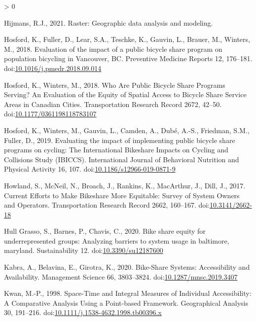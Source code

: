\documentclass[]{elsarticle} %
\newlength{\cslhangindent}
\newenvironment{CSLReferences}[2] %
 {%
  \setlength{\parindent}{0pt}
  \ifodd #1 \everypar{\setlength{\hangindent}{\cslhangindent}}\ignorespaces\fi
  \ifnum #2 > 0
  \setlength{\parskip}{#2\baselineskip}
  \fi
 }%
 {}
\begin{document}
\begin{CSLReferences}{1}{0}
\leavevmode\hypertarget{ref-R-raster}{}%
Hijmans, R.J., 2021. Raster: Geographic data analysis and modeling.

\leavevmode\hypertarget{ref-hosfordEvaluationImpactPublic2018}{}%
Hosford, K., Fuller, D., Lear, S.A., Teschke, K., Gauvin, L., Brauer,
M., Winters, M., 2018. Evaluation of the impact of a public bicycle
share program on population bicycling in {Vancouver}, {BC}. Preventive
Medicine Reports 12, 176--181.
doi:\href{https://doi.org/10.1016/j.pmedr.2018.09.014}{10.1016/j.pmedr.2018.09.014}

\leavevmode\hypertarget{ref-hosfordWhoArePublic2018}{}%
Hosford, K., Winters, M., 2018. Who {Are Public Bicycle Share Programs
Serving}? {An Evaluation} of the {Equity} of {Spatial Access} to
{Bicycle Share Service Areas} in {Canadian Cities}. Transportation
Research Record 2672, 42--50.
doi:\href{https://doi.org/10.1177/0361198118783107}{10.1177/0361198118783107}

\leavevmode\hypertarget{ref-hosfordEvaluatingImpactImplementing2019}{}%
Hosford, K., Winters, M., Gauvin, L., Camden, A., Dubé, A.-S., Friedman,
S.M., Fuller, D., 2019. Evaluating the impact of implementing public
bicycle share programs on cycling: The {International Bikeshare Impacts}
on {Cycling} and {Collisions Study} ({IBICCS}). International Journal of
Behavioral Nutrition and Physical Activity 16, 107.
doi:\href{https://doi.org/10.1186/s12966-019-0871-9}{10.1186/s12966-019-0871-9}

\leavevmode\hypertarget{ref-howlandCurrentEffortsMake2017}{}%
Howland, S., McNeil, N., Broach, J., Rankins, K., MacArthur, J., Dill,
J., 2017. Current {Efforts} to {Make Bikeshare More Equitable}: {Survey}
of {System Owners} and {Operators}. Transportation Research Record 2662,
160--167. doi:\href{https://doi.org/10.3141/2662-18}{10.3141/2662-18}

\leavevmode\hypertarget{ref-hullgrassoBikeShareEquity2020}{}%
Hull Grasso, S., Barnes, P., Chavis, C., 2020. Bike share equity for
underrepresented groups: Analyzing barriers to system usage in
baltimore, maryland. Sustainability 12.
doi:\href{https://doi.org/10.3390/su12187600}{10.3390/su12187600}

\leavevmode\hypertarget{ref-kabraBikeShareSystemsAccessibility2020}{}%
Kabra, A., Belavina, E., Girotra, K., 2020. Bike-{Share Systems}:
{Accessibility} and {Availability}. Management Science 66, 3803--3824.
doi:\href{https://doi.org/10.1287/mnsc.2019.3407}{10.1287/mnsc.2019.3407}

\leavevmode\hypertarget{ref-kwanSpaceTimeIntegral1998}{}%
Kwan, M.-P., 1998. Space-{Time} and {Integral Measures} of {Individual
Accessibility}: {A Comparative Analysis Using} a {Point}-based
{Framework}. Geographical Analysis 30, 191--216.
doi:\href{https://doi.org/10.1111/j.1538-4632.1998.tb00396.x}{10.1111/j.1538-4632.1998.tb00396.x}


\end{CSLReferences}
\end{document}

